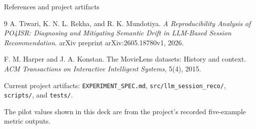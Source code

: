\documentclass[aspectratio=169,12pt]{beamer}
\newcommand{\code}[1]{\texttt{\footnotesize #1}}
\begin{document}
\begin{frame}{References and project artifacts}
\footnotesize
\begin{thebibliography}{9}
A. Tiwari, K. N. L. Rekha, and R. K. Mundotiya.
\newblock \emph{A Reproducibility Analysis of PO4ISR: Diagnosing and Mitigating
Semantic Drift in LLM-Based Session Recommendation}.
\newblock arXiv preprint arXiv:2605.18780v1, 2026.

F. M. Harper and J. A. Konstan.
\newblock The MovieLens datasets: History and context.
\newblock \emph{ACM Transactions on Interactive Intelligent Systems}, 5(4), 2015.

Current project artifacts:
\code{EXPERIMENT\_SPEC.md}, \code{src/llm\_session\_reco/},
\code{scripts/}, and \code{tests/}.
\end{thebibliography}

\vspace{0.4em}
\centering
\textcolor{Muted}{The pilot values shown in this deck are from the project's
recorded five-example metric outputs.}
\end{frame}
\end{document}
